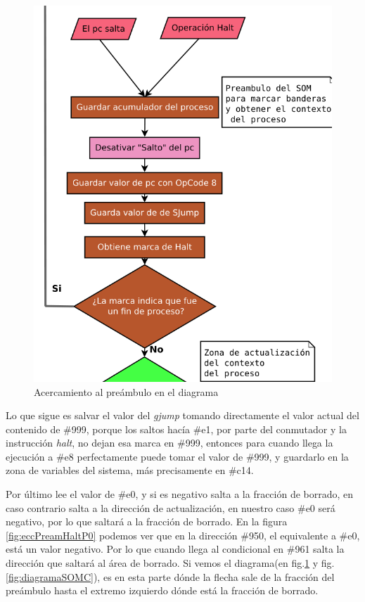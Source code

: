 \documentclass[letterpaper,12pt,oneside]{book}
\begin{document}
        \begin{figure}[h]		
			\centering
			\includegraphics[scale=0.4]{media/CARDIACC/diagPreambulo.png}
			\caption{Acercamiento al preámbulo en el diagrama}
			\label{fig:diagZoomPreambulo}
		\end{figure}
  
        Lo que sigue es salvar el valor del \textit{gjump} tomando directamente el valor actual del
		contenido de \#999, porque los saltos hacía \#e1, por parte del conmutador y la instrucción \textit{halt}, no dejan esa marca en \#999, entonces para cuando llega la ejecución a \#e8 perfectamente puede tomar el
		valor de \#999, y guardarlo en la zona de variables del sistema, más precisamente en \#c14.
  
        Por último lee el valor de \#e0, y si es negativo salta a la fracción de borrado,
		en caso contrario salta a la dirección de actualización, en nuestro caso \#e0 será negativo, por lo que saltará a la fracción de borrado. En
		la figura \ref{fig:eccPreamHaltP0} podemos ver que en la dirección \#950, el equivalente a \#e0, está un valor negativo. Por lo que cuando llega
		al condicional en \#961 salta la dirección que saltará al área de borrado. Si vemos el diagrama(en fig.\ref{fig:diagZoomPreambulo} y fig.\ref{fig:diagramaSOMC}), es en esta parte dónde 
		  la flecha sale de la fracción del preámbulo hasta el extremo izquierdo dónde está la fracción de borrado.
\end{document}
